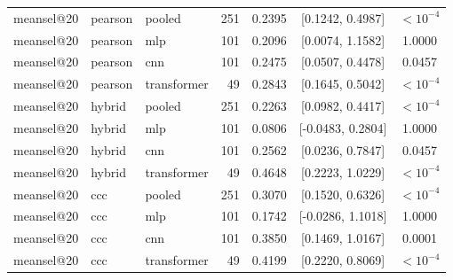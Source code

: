 \begin{longtable}{lllrrcc}
meansel@20 & pearson & pooled & 251 & 0.2395 & [0.1242, 0.4987] & $<10^{-4}$ \\
meansel@20 & pearson & mlp & 101 & 0.2096 & [0.0074, 1.1582] & 1.0000 \\
meansel@20 & pearson & cnn & 101 & 0.2475 & [0.0507, 0.4478] & 0.0457 \\
meansel@20 & pearson & transformer & 49 & 0.2843 & [0.1645, 0.5042] & $<10^{-4}$ \\
meansel@20 & hybrid & pooled & 251 & 0.2263 & [0.0982, 0.4417] & $<10^{-4}$ \\
meansel@20 & hybrid & mlp & 101 & 0.0806 & [-0.0483, 0.2804] & 1.0000 \\
meansel@20 & hybrid & cnn & 101 & 0.2562 & [0.0236, 0.7847] & 0.0457 \\
meansel@20 & hybrid & transformer & 49 & 0.4648 & [0.2223, 1.0229] & $<10^{-4}$ \\
meansel@20 & ccc & pooled & 251 & 0.3070 & [0.1520, 0.6326] & $<10^{-4}$ \\
meansel@20 & ccc & mlp & 101 & 0.1742 & [-0.0286, 1.1018] & 1.0000 \\
meansel@20 & ccc & cnn & 101 & 0.3850 & [0.1469, 1.0167] & 0.0001 \\
meansel@20 & ccc & transformer & 49 & 0.4199 & [0.2220, 0.8069] & $<10^{-4}$ \\
\end{longtable}
